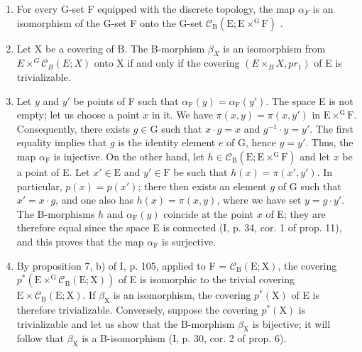 \begin{enumerate}
\def\labelenumi{\alph{enumi})}
\item
  For every G-set F equipped with the discrete topology, the map \(\alpha_{F}\) is an isomorphism of the G-set F onto the G-set \(\mathcal{C}_{\mathrm{B}}(\mathrm{E};\mathrm{E}\times^{\mathrm{G}}\mathrm{F})\) .
\item
  Let X be a covering of B. The B-morphism \(\beta_{X}\) is an isomorphism from \(E \times^{G} \mathcal{C}_{B}(E; X)\) onto X if and only if the covering \((E \times_{B} X, pr_{1})\) of E is trivializable.
\item
  Let \(y\) and \(y'\) be points of F such that \(\alpha_{\mathrm{F}}(y) = \alpha_{\mathrm{F}}(y')\). The space E is not empty; let us choose a point \(x\) in it. We have \(\pi(x, y) = \pi(x, y')\) in \(\mathrm{E} \times^{\mathrm{G}} \mathrm{F}\). Consequently, there exists \(g \in \mathrm{G}\) such that \(x \cdot g = x\) and \(g^{-1} \cdot y = y'\). The first equality implies that \(g\) is the identity element \(e\) of G, hence \(y = y'\). Thus, the map \(\alpha_{\mathrm{F}}\) is injective. On the other hand, let \(h \in \mathcal{C}_{\mathrm{B}}(\mathrm{E}; \mathrm{E} \times^{\mathrm{G}} \mathrm{F})\) and let \(x\) be a point of E. Let \(x' \in \mathrm{E}\) and \(y' \in \mathrm{F}\) be such that \(h(x) = \pi(x', y')\). In particular, \(p(x) = p(x')\); there then exists an element \(g\) of G such that \(x' = x \cdot g\), and one also has \(h(x) = \pi(x, y)\), where we have set \(y = g \cdot y'\). The B-morphisms \(h\) and \(\alpha_{\mathrm{F}}(y)\) coincide at the point \(x\) of E; they are therefore equal since the space E is connected (I, p. 34, cor. 1 of prop. 11), and this proves that the map \(\alpha_{\mathrm{F}}\) is surjective.
\item
  By proposition 7, b) of I, p. 105, applied to F = \(\mathcal{C}_{\mathrm{B}}(\mathrm{E};\mathrm{X})\), the covering \(p^{*}(\mathrm{E}\times^{\mathrm{G}}\mathcal{C}_{\mathrm{B}}(\mathrm{E};\mathrm{X}))\) of E is isomorphic to the trivial covering \(\mathrm{E}\times \mathcal{C}_{\mathrm{B}}(\mathrm{E};\mathrm{X})\). If \(\beta_{\mathrm{X}}\) is an isomorphism, the covering \(p^{*}(\mathrm{X})\) of E is therefore trivializable. Conversely, suppose the covering \(p^{*}(\mathrm{X})\) is trivializable and let us show that the B-morphism \(\beta_{\mathrm{X}}\) is bijective; it will follow that \(\beta_{\mathrm{X}}\) is a B-isomorphism (I, p. 30, cor. 2 of prop. 6).
\end{enumerate}

